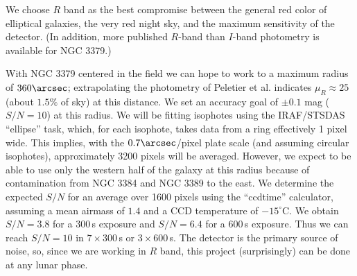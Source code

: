\clearpage


%


\expdesign

We choose $R$ band as the best compromise between the general red color
of elliptical galaxies, the very red night sky, and the maximum sensitivity
of the detector. (In addition, more published $R$-band than $I$-band photometry
is available for NGC 3379.)

With NGC 3379 centered in the field we can hope to work to a maximum
radius of $360\arcsec$; extrapolating the photometry of Peletier et al.
indicates $\mu_R \approx 25$ (about $1.5\%$ of sky) at this distance. We
set an accuracy goal of $\pm 0.1$ mag ($S/N=10$) at this radius. We will be
fitting isophotes using the IRAF/STSDAS ``ellipse'' task, which, for each
isophote, takes data from a ring effectively 1 pixel wide. This implies,
with the $0.7\arcsec$/pixel plate scale (and assuming circular isophotes),
approximately 3200 pixels will be averaged. However, we expect to be
able to use only the western half of the galaxy at this radius because
of contamination from NGC 3384 and NGC 3389 to the east. We determine
the expected $S/N$ for an average over 1600 pixels using the ``ccdtime''
calculator, assuming a mean airmass of $1.4$ and a CCD temperature of
$-15^\circ$C. We obtain $S/N=3.8$ for a $300\,$s exposure and $S/N=6.4$
for a $600\,$s exposure. Thus we can reach $S/N=10$ in $7 \times 300\,$s
or $3 \times 600\,$s. The detector is the primary source of noise, so,
since we are working in $R$ band, this project (surprisingly) can be
done at any lunar phase.

